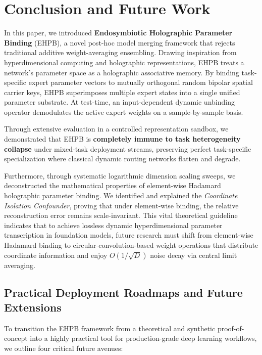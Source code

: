 \section{Conclusion and Future Work}
\label{sec:conclusion}

In this paper, we introduced \textbf{Endosymbiotic Holographic Parameter Binding} (EHPB), a novel post-hoc model merging framework that rejects traditional additive weight-averaging ensembling. Drawing inspiration from hyperdimensional computing and holographic representations, EHPB treats a network's parameter space as a holographic associative memory. By binding task-specific expert parameter vectors to mutually orthogonal random bipolar spatial carrier keys, EHPB superimposes multiple expert states into a single unified parameter substrate. At test-time, an input-dependent dynamic unbinding operator demodulates the active expert weights on a sample-by-sample basis. 

Through extensive evaluation in a controlled representation sandbox, we demonstrated that EHPB is \textbf{completely immune to task heterogeneity collapse} under mixed-task deployment streams, preserving perfect task-specific specialization where classical dynamic routing networks flatten and degrade.

Furthermore, through systematic logarithmic dimension scaling sweeps, we deconstructed the mathematical properties of element-wise Hadamard holographic parameter binding. We identified and explained the \textit{Coordinate Isolation Confounder}, proving that under element-wise binding, the relative reconstruction error remains scale-invariant. This vital theoretical guideline indicates that to achieve lossless dynamic hyperdimensional parameter transcription in foundation models, future research must shift from element-wise Hadamard binding to circular-convolution-based weight operations that distribute coordinate information and enjoy $O(1/\sqrt{D})$ noise decay via central limit averaging.

\subsection{Practical Deployment Roadmaps and Future Extensions}
\label{subsec:future_roadmap}

To transition the EHPB framework from a theoretical and synthetic proof-of-concept into a highly practical tool for production-grade deep learning workflows, we outline four critical future avenues:

